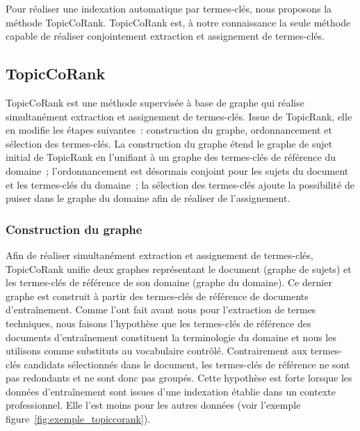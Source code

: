   Pour réaliser une indexation automatique par termes-clés, nous proposons la
  méthode TopicCoRank. TopicCoRank est, à notre connaissance la seule méthode
  capable de réaliser conjointement extraction et assignement de termes-clés.

  \subsection{TopicCoRank}
  \label{subsec:main-domain_specific_keyphrase_annotation-supervised_automatic_keyphrase_annotation-topiccorank}
    TopicCoRank est une méthode supervisée à base de graphe qui réalise
    simultanément extraction et assignement de termes-clés. Issue de
    TopicRank, elle en modifie les étapes suivantes~: construction du graphe,
    ordonnancement et sélection des termes-clés. La construction du graphe
    étend le graphe de sujet initial de TopicRank en l'unifiant à un graphe
    des termes-clés de référence du domaine~; l'ordonnancement est désormais
    conjoint pour les sujets du document et les termes-clés du domaine~; la
    sélection des termes-clés ajoute la possibilité de puiser dans le graphe
    du domaine afin de réaliser de l'assignement.

    \subsubsection{Construction du graphe}
    \label{subsubsec:main-domain_specific_keyphrase_annotation-supervised_automatic_keyphrase_extraction-topiccorank-graph_construction}
      Afin de réaliser simultanément extraction et assignement de termes-clés,
      TopicCoRank unifie deux graphes représentant le document (graphe de
      sujets) et les termes-clés de référence de son domaine (graphe du
      domaine). Ce dernier graphe est construit à partir des termes-clés de
      référence de documents d'entraînement. Comme  l'ont
      fait avant nous pour l'extraction de termes techniques, nous faisons
      l'hypothèse que les termes-clés de référence des documents
      d'entraînement constituent la terminologie du domaine et nous les
      utilisons comme substituts au vocabulaire contrôlé. Contrairement aux
      termes-clés candidats sélectionnés dans le document, les termes-clés de
      référence ne sont pas redondants et ne sont donc pas groupés. Cette
      hypothèse est forte lorsque les données d'entraînement sont
      issues d'une indexation établie dans un contexte professionnel. Elle
      l'est moins pour les autres données (voir l'exemple figure~\ref{fig:exemple_topiccorank}).

